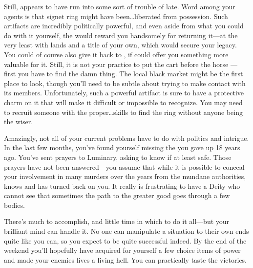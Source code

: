 \documentclass[char]{GL2020}
\begin{document}
Still, \cPrince{} appears to have run into some sort of trouble of late. Word among your agents is that \cPrince{\their} signet ring might have been\ldots{}liberated from \cPrince{\their} possession. Such artifacts are incredibly politically powerful, and even aside from what you could do with it yourself, the \cQueen{\Majesty} would reward you handsomely for returning it---at the very least with lands and a title of your own, which would secure your legacy. You could of course also give it back to \cPrince{}, if \cPrince{\they} could offer you something more valuable for it. Still, it is not your practice to put the cart before the horse — first you have to find the damn thing. The local black market might be the first place to look, though you'll need to be subtle about trying to make contact with its members. Unfortunately, such a powerful artifact is sure to have a protective charm on it that will make it difficult or impossible to recognize. You may need to recruit someone with the proper\ldots{}skills to find the ring without anyone being the wiser.

Amazingly, not all of your current problems have to do with politics and intrigue. In the last few months, you've found yourself missing the \cPirateChild{\child} you gave up 18 years ago. You've sent prayers to Luminary, asking to know if \cPirateChild{\theyare} at least safe. Those prayers have not been answered---you assume that while it is possible to conceal your involvement in many murders over the years  from the mundane authorities, \cFarmGod{} knows and has turned \cFarmGod{\their} back on you. It really is frustrating to have a Deity who cannot see that sometimes the path to the greater good goes through a few bodies.

There's much to accomplish, and little time in which to do it all---but your brilliant mind can handle it. No one can manipulate a situation to their own ends quite like you can, so you expect to be quite successful indeed. By the end of the weekend you'll hopefully have acquired for yourself a few choice items of power and made your enemies lives a living hell.  You can practically taste the victories.
\end{document}
